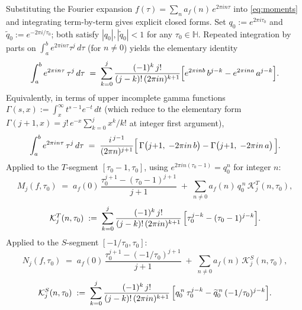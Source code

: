 \documentclass[11pt,letterpaper]{article}
\newcommand{\HH}{\mathbb{H}}
\begin{document}
Substituting the Fourier expansion $f(\tau) = \sum_{n} a_f(n)\,e^{2\pi i n \tau}$
into \eqref{eq:moments} and integrating term-by-term gives explicit closed
forms.  Set $q_0 := e^{2\pi i \tau_0}$ and $\widetilde q_0 := e^{-2\pi i / \tau_0}$;
both satisfy $|q_0|, |\widetilde q_0| < 1$ for any $\tau_0 \in \HH$.  Repeated
integration by parts on $\int_a^b e^{2\pi i n\tau}\tau^j\,d\tau$ (for $n \ne 0$)
yields the elementary identity
\begin{equation}\label{eq:int-by-parts}
  \int_a^b e^{2\pi i n \tau}\,\tau^j\,d\tau
    \;=\; \sum_{k=0}^{j}\frac{(-1)^k\,j!}{(j-k)!\,(2\pi i n)^{k+1}}
      \Bigl[e^{2\pi i n b}\,b^{j-k} - e^{2\pi i n a}\,a^{j-k}\Bigr].
\end{equation}
Equivalently, in terms of upper incomplete gamma functions $\Gamma(s,x) :=
\int_x^\infty t^{s-1}e^{-t}\,dt$ (which reduce to the elementary form
$\Gamma(j{+}1, x) = j!\,e^{-x}\sum_{k=0}^{j}x^k/k!$ at integer first argument),
\begin{equation}\label{eq:int-incgamma}
  \int_a^b e^{2\pi i n \tau}\,\tau^j\,d\tau
   \;=\; \frac{i^{\,j-1}}{(2\pi n)^{j+1}}
         \Bigl[\,\Gamma\bigl(j{+}1,\;-2\pi i n\,b\bigr)
              -\Gamma\bigl(j{+}1,\;-2\pi i n\,a\bigr)\,\Bigr].
\end{equation}
Applied to the $T$-segment $[\tau_0-1, \tau_0]$, using $e^{2\pi i n (\tau_0-1)}
= q_0^n$ for integer $n$:
\begin{equation}\label{eq:M-explicit}
  \boxed{\;
  M_j(f, \tau_0)
  \;=\; a_f(0)\,\frac{\tau_0^{j+1} - (\tau_0-1)^{j+1}}{j+1}
    \;+\;\sum_{n \ne 0} a_f(n)\,q_0^{\,n}\,\mathcal{K}^T_j(n,\tau_0),
  \;}
\end{equation}
\begin{equation}\label{eq:KT}
  \mathcal{K}^T_j(n,\tau_0) \;:=\;
    \sum_{k=0}^{j}\frac{(-1)^k\,j!}{(j-k)!\,(2\pi i n)^{k+1}}\,
    \Bigl[\tau_0^{j-k} - (\tau_0-1)^{j-k}\Bigr].
\end{equation}
Applied to the $S$-segment $[-1/\tau_0, \tau_0]$:
\begin{equation}\label{eq:N-explicit}
  \boxed{\;
  N_j(f, \tau_0)
  \;=\; a_f(0)\,\frac{\tau_0^{j+1} - (-1/\tau_0)^{j+1}}{j+1}
    \;+\;\sum_{n \ne 0} a_f(n)\,\mathcal{K}^S_j(n,\tau_0),
  \;}
\end{equation}
\begin{equation}\label{eq:KS}
  \mathcal{K}^S_j(n,\tau_0) \;:=\;
    \sum_{k=0}^{j}\frac{(-1)^k\,j!}{(j-k)!\,(2\pi i n)^{k+1}}\,
    \Bigl[q_0^{\,n}\,\tau_0^{j-k}
       - \widetilde q_0^{\,n}\,(-1/\tau_0)^{j-k}\Bigr].
\end{equation}
\end{document}
